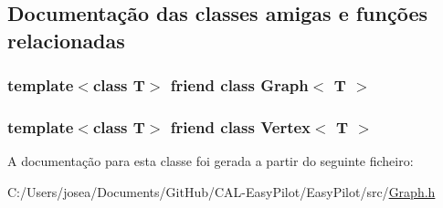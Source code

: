 \subsection{Documentação das classes amigas e funções relacionadas}
\hypertarget{class_edge_aefa9b76cd57411c5354e5620dc2d84dd}{}
\subsubsection[{Graph$<$ T $>$}]{\setlength{\rightskip}{0pt plus 5cm}template$<$class T$>$ friend class {\bf Graph}$<$ T $>$\hspace{0.3cm}{\ttfamily [friend]}}\label{class_edge_aefa9b76cd57411c5354e5620dc2d84dd}
\hypertarget{class_edge_a2e120a12dec663fa334633b4f26cbed8}{}
\subsubsection[{Vertex$<$ T $>$}]{\setlength{\rightskip}{0pt plus 5cm}template$<$class T$>$ friend class {\bf Vertex}$<$ T $>$\hspace{0.3cm}{\ttfamily [friend]}}\label{class_edge_a2e120a12dec663fa334633b4f26cbed8}


A documentação para esta classe foi gerada a partir do seguinte ficheiro\+:\begin{DoxyCompactItemize}
\item 
C\+:/\+Users/josea/\+Documents/\+Git\+Hub/\+C\+A\+L-\/\+Easy\+Pilot/\+Easy\+Pilot/src/\hyperlink{_graph_8h}{Graph.\+h}\end{DoxyCompactItemize}
